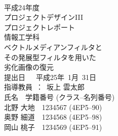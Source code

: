 

\begin{titlepage}
 \begin{center}
  ~\\
  \vspace{1cm}
  {\Large 
  平成24年度\\
 プロジェクトデザインIII\\
  プロジェクトレポート\\
情報工学科\\}
  \vspace{1.3in}
  {\Huge \gt 
ベクトルメディアンフィルタと\\
その発展型フィルタを用いた\\
劣化画像の復元\\
  }
  \vspace{2in}
  {\LARGE 
  提出日~~~平成25年~1月~31日\\
  \vspace{0.4in}
  指導教員~：~坂上 雲太郎\\
 \vspace{0.9in}
  氏名　学籍番号 (クラス--名列番号)\\
  \vspace{2mm}
  北野 大地　1234567 (4EP5--90)\\
  奥野 細道　1234568 (4EP5--98)\\
  岡山 桃子　1234569 (4EP5--91)\\
  }
 \end{center}
\end{titlepage}

